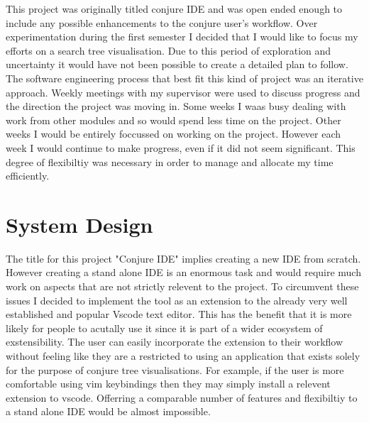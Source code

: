 \documentclass{article}
\begin{document}
This project was originally titled conjure IDE and was open ended enough to include any possible enhancements to the conjure user's workflow. Over experimentation during the first semester I decided that I would like to focus my efforts on a search tree visualisation. Due to this period of exploration and uncertainty it would have not been possible to create a detailed plan to follow. The software engineering process that best fit this kind of project was an iterative approach. Weekly meetings with my supervisor were used to discuss progress and the direction the project was moving in. Some weeks I waas busy dealing with work from other modules and so would spend less time on the project. Other weeks I would be entirely foccussed on working on the project. However each week I would continue to make progress, even if it did not seem significant. This degree of flexibiltiy was necessary in order to manage and allocate my time efficiently. 

\section{System Design}

The title for this project "Conjure IDE" implies creating a new IDE from scratch. However creating a stand alone IDE is an enormous task and would require much work on aspects that are not strictly relevent to the project. 
To circumvent these issues I decided to implement the tool as an extension to the already very well established and popular Vscode text editor. This has the benefit that it is more likely for people to acutally use it since it is part of a wider ecosystem of exstensibility. The user can easily incorporate the extension to their workflow without feeling like they are a restricted to using an application that exists solely for the purpose of conjure tree visualisations. For example, if the user is more comfortable using vim keybindings then they may simply install a relevent extension to vscode. Offerring a comparable number of features and flexibiltiy to a stand alone IDE would be almost impossible.  
\end{document}
